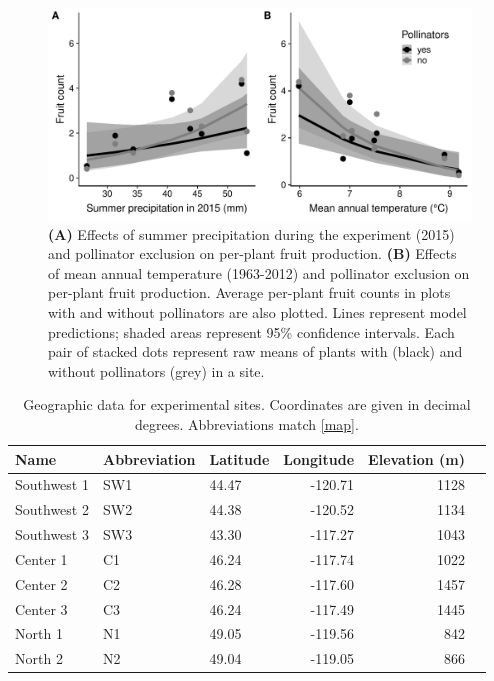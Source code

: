 \documentclass{article}
\newcommand{\beginsupplement}{%
        \setcounter{table}{0}
        \renewcommand{\thetable}{S\arabic{table}}%
        \setcounter{figure}{0}
        \renewcommand{\thefigure}{S\arabic{figure}}%
     }
\begin{document}
\clearpage


\begin{figure}[p]
\centering
\includegraphics[width = \textwidth]{figs/fruit_climate}
\caption[Effects of climate and pollinator exclusion on per-plant fruit production]{\textbf{(A)} Effects of summer precipitation during the experiment (2015) and pollinator exclusion on per-plant fruit production. \textbf{(B)} Effects of mean annual temperature (1963-2012) and pollinator exclusion on per-plant fruit production. Average per-plant fruit counts in plots with and without pollinators are also plotted. Lines represent model predictions; shaded areas represent 95\% confidence intervals. Each pair of stacked dots represent raw means of plants with (black) and without pollinators (grey) in a site.}
\label{fruitsclimate}
\end{figure}


\beginsupplement

\clearpage


\begin{table}[p]
\centering
\captionsetup{singlelinecheck = false, justification=justified}
\caption[Geographic data for experimental sites]{Geographic data for experimental sites. Coordinates are given in decimal degrees. Abbreviations match \autoref{map}.}
\begin{tabular}{lllrrr}
\toprule
Name        & Abbreviation & Latitude & Longitude & Elevation (m) \\
\midrule
Southwest 1 & SW1         & 44.47   & -120.71  & 1128          \\ %
Southwest 2 & SW2         & 44.38   & -120.52  & 1134          \\ %
Southwest 3 & SW3         & 43.30   & -117.27  & 1043          \\ %
Center 1    & C1          & 46.24   & -117.74  & 1022          \\ %
Center 2    & C2          & 46.28   & -117.60  & 1457          \\ %
Center 3    & C3          & 46.24   & -117.49  & 1445          \\ %
North 1     & N1          & 49.05    & -119.56   & 842         \\ %
North 2     & N2          & 49.04    & -119.05   & 866         \\ %
\bottomrule
\end{tabular}
\label{siteinfo}
\end{table}
\end{document}
